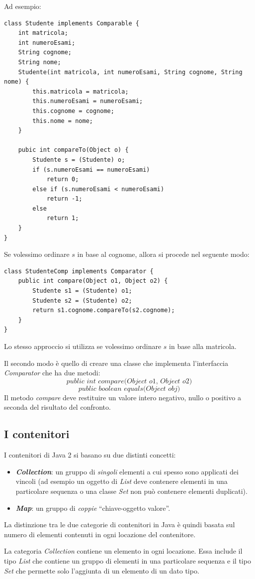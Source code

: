 \documentclass[12pt]{report}
\begin{document}
Ad esempio:
\begin{lstlisting}[style=javastyle]
class Studente implements Comparable {
	int matricola;
	int numeroEsami;
	String cognome;
	String nome;
	Studente(int matricola, int numeroEsami, String cognome, String nome) {
		this.matricola = matricola;
		this.numeroEsami = numeroEsami;
		this.cognome = cognome;
		this.nome = nome;
	}

	pubic int compareTo(Object o) {
		Studente s = (Studente) o;
		if (s.numeroEsami == numeroEsami)
			return 0;
		else if (s.numeroEsami < numeroEsami)
			return -1;
		else
			return 1;
	}
}
\end{lstlisting}
Se volessimo ordinare $s$ in base al cognome, allora si procede nel seguente modo:
\begin{lstlisting}[style=javastyle]
class StudenteComp implements Comparator {
	public int compare(Object o1, Object o2) {
		Studente s1 = (Studente) o1;
		Studente s2 = (Studente) o2;
		return s1.cognome.compareTo(s2.cognome);
	}
}
\end{lstlisting}
Lo stesso approccio si utilizza se volessimo ordinare $s$ in base alla matricola.

Il secondo modo è quello di creare una classe che implementa l'interfaccia \textit{Comparator} che ha due metodi:
\[
\textit{public int compare(Object o1, Object o2)}
\]
\[
\textit{public boolean equals(Object obj)}
\]
Il metodo \textit{compare} deve restituire un valore intero negativo, nullo o positivo a seconda del risultato del confronto.
\subsection{I contenitori}
I contenitori di Java 2 si basano su due distinti concetti:
\begin{itemize}
	\item \textbf{\textit{Collection}}: un gruppo di \textit{singoli} elementi a cui spesso sono applicati dei vincoli (ad esempio un oggetto di \textit{List} deve contenere elementi in una particolare sequenza o una classe \textit{Set} non può contenere elementi duplicati).
	\item \textbf{\textit{Map}}: un gruppo di \textit{coppie} ``chiave-oggetto valore''.
\end{itemize}
La distinzione tra le due categorie di contenitori in Java è quindi basata sul numero di elementi contenuti in ogni locazione del contenitore.

La categoria \textit{Collection} contiene un elemento in ogni locazione. Essa include il tipo \textit{List} che contiene un gruppo di elementi in una particolare sequenza e il tipo \textit{Set} che permette solo l'aggiunta di un elemento di un dato tipo.
\end{document}

